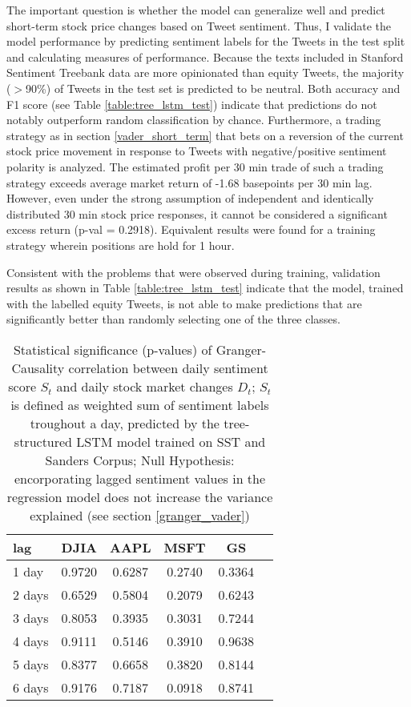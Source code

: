 \documentclass[a4paper,12pt]{article}%
\begin{document}
The important question is whether the model can generalize well and predict short-term stock price changes based on Tweet sentiment. Thus, I validate the model performance by predicting sentiment labels for the Tweets in the test split and calculating measures of performance. Because the texts included in Stanford Sentiment Treebank data are more opinionated than equity Tweets, the majority ($>$90\%) of Tweets in the test set is predicted to be neutral. Both accuracy and F1 score (see Table \ref{table:tree_lstm_test}) indicate that predictions do not notably outperform random classification by chance. Furthermore, a trading strategy as in section \ref{vader_short_term} that bets on a reversion of the current stock price movement in response to Tweets with negative/positive sentiment polarity is analyzed. The estimated profit per 30 min trade of such a trading strategy exceeds average market return of -1.68 basepoints per 30 min lag. However, even under the strong assumption of independent and identically distributed 30 min stock price responses, it cannot be considered a significant excess return (p-val = 0.2918). Equivalent results were found for a training strategy wherein positions are hold for 1 hour.

Consistent with the problems that were observed during training, validation results as shown in Table \ref{table:tree_lstm_test} indicate that the model, trained with the labelled equity Tweets, is not able to make predictions that are significantly better than randomly selecting one of the three classes.


\begin{table}
\centering
\captionsetup{justification=centering}
\begin{tabular}{l|c c c c c}
\hline
lag & DJIA & AAPL & MSFT & GS \\ \hline
1 day   & 0.9720 & 0.6287 & 0.2740 & 0.3364 \\ 
2 days  & 0.6529 & 0.5804 & 0.2079 & 0.6243 \\ 
3 days  & 0.8053 & 0.3935 & 0.3031 & 0.7244 \\ 
4 days  & 0.9111 & 0.5146 & 0.3910 & 0.9638 \\ 
5 days  & 0.8377 & 0.6658 & 0.3820 & 0.8144 \\ 
6 days  & 0.9176 & 0.7187 & 0.0918 & 0.8741 \\ \hline

\end{tabular}
\caption[Statistical Significance of Granger-Correlation Bewteen Aggreagted Tree-LSTM Sentiment Scores and Daily DJIA Changes]{Statistical significance (p-values) of Granger-Causality correlation between daily sentiment score $S_t$ and daily stock market changes $D_t$; $S_t$ is defined as weighted sum of sentiment labels troughout a day, predicted by the tree-structured LSTM model trained on SST and Sanders Corpus; Null Hypothesis: encorporating lagged sentiment values in the regression model does not increase the variance explained (see section \ref{granger_vader})\label{table:granger_lstm}}
\end{table}
\end{document}
